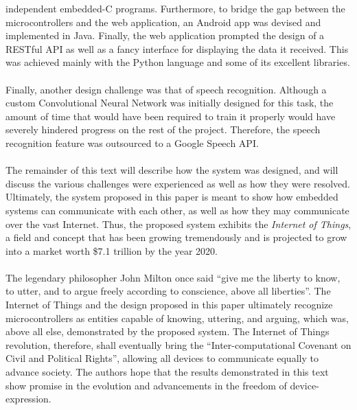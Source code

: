 independent embedded-C programs. Furthermore, to bridge the gap between the microcontrollers and the
web application, an Android app was devised and implemented in Java. Finally, the web application
prompted the design of a RESTful API as well as a fancy interface for displaying the data it
received. This was achieved mainly with the Python language and some of its excellent libraries.\\\\
Finally, another design challenge was that of speech recognition. Although a custom Convolutional
Neural Network was initially designed for this task, the amount of time that would have been
required to train it properly would have severely hindered progress on the rest of the project.
Therefore, the speech recognition feature was outsourced to a Google Speech API.\\\\
The remainder of this text will describe how the system was designed, and will discuss the various
challenges were experienced as well as how they were resolved. Ultimately, the system proposed in
this paper is meant to show how embedded systems can communicate with each other, as well as how
they may communicate over the vast Internet. Thus, the proposed system exhibits the
\textit{Internet of Things}, a field and concept that has been growing tremendously and is projected
to grow into a market worth \$7.1 trillion by the year 2020\cite{iot}.\\\\
The legendary philosopher John Milton once said ``give me the liberty to know, to utter, and to
argue freely according to conscience, above all liberties''\cite{ethics}. The Internet of Things and
the design proposed in this paper ultimately recognize microcontrollers as entities capable of
knowing, uttering, and arguing, which was, above all else, demonstrated by the proposed system. The
Internet of Things revolution, therefore, shall eventually bring the ``Inter-computational Covenant
on Civil and Political Rights'', allowing all devices to communicate equally to advance society. The
authors hope that the results demonstrated in this text show promise in the evolution and
advancements in the freedom of device-expression.
